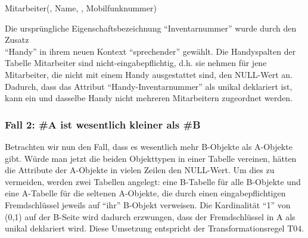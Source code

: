 \begin{center}
\end{center}
\begin{small}
    Mitarbeiter(, Name, , Mobilfunknummer)
\end{small}
\clearpage
Die ursprüngliche Eigenschaftsbezeichnung \enquote{Inventarnummer}
wurde durch den Zusatz\\ \enquote{Handy} in ihrem neuen Kontext
\enquote{sprechender} gewählt. Die Handyspalten der Tabelle
Mitarbeiter sind nicht-eingabepflichtig, d.h. sie nehmen für jene
Mitarbeiter, die nicht mit einem Handy ausgestattet sind, den
NULL-Wert an. Dadurch, dass das Attribut
\enquote{Handy-Inventarnummer} als unikal deklariert ist, kann ein und
dasselbe Handy nicht mehreren Mitarbeitern zugeordnet werden.
\subsubsection{Fall 2: \#A ist wesentlich kleiner als \#B}
Betrachten wir nun den Fall, dass es wesentlich mehr B-Objekte als A-Objekte gibt. Würde man jetzt die beiden Objekttypen in einer Tabelle vereinen, hätten die Attribute der A-Objekte in vielen Zeilen den NULL-Wert. Um dies zu vermeiden, werden zwei Tabellen angelegt: eine B-Tabelle für alle B-Objekte und eine A-Tabelle für die seltenen A-Objekte, die durch einen eingabepflichtigen Fremdschlüssel jeweils auf \enquote{ihr} B-Objekt verweisen. Die Kardinalität \enquote{1} von (0,1) auf der B-Seite wird dadurch erzwungen, dass der Fremdschlüssel in A als unikal deklariert wird. Diese Umsetzung entspricht der Transformationsregel T04.
